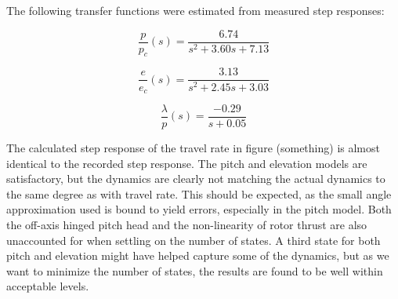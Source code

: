 The following transfer functions were estimated from measured step responses:

\begin{equation}
\label{eq:p_pc}
	\frac{p}{p_c}(s) = \frac{6.74}{s^2 + 3.60 s + 7.13}
\end{equation}

\begin{equation}
\label{eq:e_ec}
	\frac{e}{e_c}(s) = \frac{3.13}{s^2 + 2.45 s + 3.03}
\end{equation}

\begin{equation}
\label{eq:travelRate_p}
	\frac{\lambda}{p}(s) = \frac{-0.29}{s + 0.05}
\end{equation}


The calculated step response of the travel rate in figure (something) is almost identical to the recorded step response. The pitch and elevation models are satisfactory, but the dynamics are clearly not matching the actual dynamics to the same degree as with travel rate. This should be expected, as the small angle approximation used is bound to yield errors, especially in the pitch model. Both the off-axis hinged pitch head and the non-linearity of rotor thrust are also unaccounted for when settling on the number of states. A third state for both pitch and elevation might have helped capture some of the dynamics, but as we want to minimize the number of states, the results are found to be well within acceptable levels.



